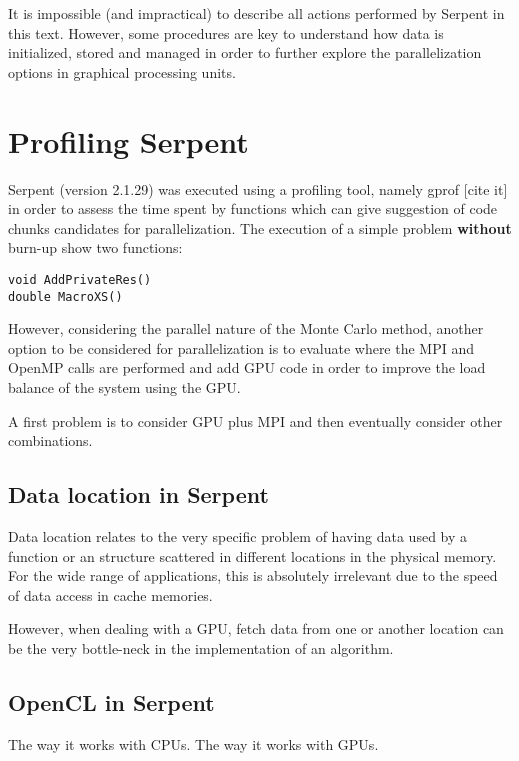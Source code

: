 \documentclass[twoside,a4paper,12pt,english,draft]{anstrans}
\begin{document}
It is impossible (and impractical) to describe all actions performed by Serpent in this text. However, some
procedures are key to understand how data is initialized, stored and managed in order to further explore
the parallelization options in graphical processing units.

\section{Profiling Serpent}

Serpent (version 2.1.29) was executed using a profiling tool, namely gprof [cite it] in order
to assess the time spent by functions which can give suggestion of code chunks candidates for
parallelization. The execution of a simple problem \textbf{without} burn-up show two functions:
\begin{verbatim}
void AddPrivateRes()
double MacroXS()
\end{verbatim}
However, considering the parallel nature of the Monte Carlo method, another option to be considered
for parallelization is to evaluate where the MPI and OpenMP calls are performed and add GPU code
in order to improve the load balance of the system using the GPU.

A first problem is to consider GPU plus MPI and then eventually consider other combinations.

\subsection{Data location in Serpent}

Data location relates to the very specific problem of having data used by a function or an
structure scattered in different locations in the physical memory. For the wide range of
applications, this is absolutely irrelevant due to the speed of data access in cache memories.

However, when dealing with a GPU, fetch data from one or another location can be the very
bottle-neck in the implementation of an algorithm.

\subsection{OpenCL in Serpent}

The way it works with CPUs.
The way it works with GPUs.
\end{document}

